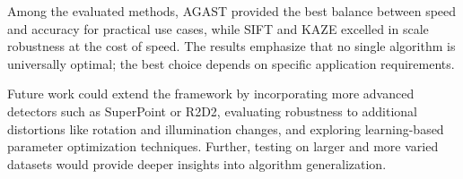 \documentclass[journal]{IEEEtran}
\begin{document}
Among the evaluated methods, AGAST provided the best balance between speed and accuracy for practical use cases, while SIFT and KAZE excelled in scale robustness at the cost of speed. The results emphasize that no single algorithm is universally optimal; the best choice depends on specific application requirements.

Future work could extend the framework by incorporating more advanced detectors such as SuperPoint or R2D2, evaluating robustness to additional distortions like rotation and illumination changes, and exploring learning-based parameter optimization techniques. Further, testing on larger and more varied datasets would provide deeper insights into algorithm generalization.




\end{document}
